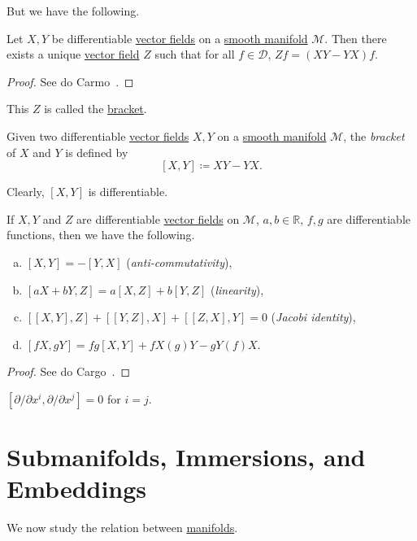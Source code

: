 But we have the following.

\begin{lemma}
	Let \(X, Y\) be differentiable \hyperref[def:vector-field]{vector fields} on a \hyperref[def:smooth-manifold]{smooth manifold} \(\mathcal{M} \). Then there exists a unique \hyperref[def:vector-field]{vector field} \(Z\) such that for all \(f\in \mathcal{D} \), \(Zf = (XY - YX)f\).
\end{lemma}
\begin{proof}
	See do Carmo~\cite[Chapter 0, Lemma 5.2]{flaherty2013riemannian}.
\end{proof}

This \(Z\) is called the \hyperref[def:bracket]{bracket}.

\begin{definition}[Bracket]\label{def:bracket}
	Given two differentiable \hyperref[def:vector-field]{vector fields} \(X, Y\) on a \hyperref[def:smooth-manifold]{smooth manifold} \(\mathcal{M} \), the \emph{bracket} of \(X\) and \(Y\) is defined by
	\[
		[X, Y] \coloneqq XY - YX.
	\]
\end{definition}

Clearly, \([X, Y]\) is differentiable.

\begin{proposition}
	If \(X, Y\) and \(Z\) are differentiable \hyperref[def:vector-field]{vector fields} on \(\mathcal{M} \), \(a, b\in \mathbb{R} \), \(f, g\) are differentiable functions, then we have the following.
	\begin{enumerate}[(a)]
		\item \([X, Y] = -[Y, X]\) (\emph{anti-commutativity}),
		\item \([aX + bY, Z] = a[X, Z] + b[Y, Z]\) (\emph{linearity}),
		\item \([[X, Y], Z] + [[Y, Z], X] + [[Z, X], Y] = 0\) (\emph{Jacobi identity}),
		\item \([fX, gY] = fg[X, Y] + fX(g)Y - gY(f)X\).
	\end{enumerate}
\end{proposition}
\begin{proof}
	See do Cargo~\cite[Chapter 0, Proposition 5.3]{flaherty2013riemannian}.
\end{proof}

\begin{eg}
	\([\partial / \partial x^i, \partial / \partial x^j] = 0\) for \(i = j\).
\end{eg}

\section{Submanifolds, Immersions, and Embeddings}
We now study the relation between \hyperref[def:smooth-manifold]{manifolds}.

